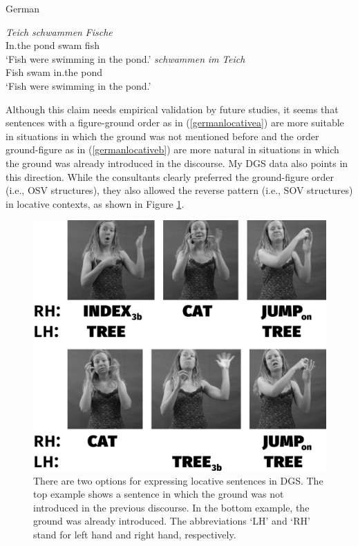 \begin{exe}
\ex German \label{germanlocative}\begin{xlist} 
\ex {} {\textit{Teich}} {\textit{schwammen}} {\textit{Fische}}\\
{In.the} {pond} {swam} {fish}  \\
\trans `Fish were swimming in the pond.' \label{germanlocativea}
\ex {} {\textit{schwammen}} {\textit{im}} {\textit{Teich}}  \\
{Fish} {swam} {in.the} {pond} \\
\trans `Fish were swimming in the pond.' \label{germanlocativeb}

\end{xlist}
\end{exe} 

\noindent Although this claim needs empirical validation by future studies, it seems that sentences with a figure-ground order as in (\ref{germanlocativea}) are more suitable in situations in which the ground was not mentioned before and the order ground-figure as in  (\ref{germanlocativeb}) are more natural in situations in which the ground was already introduced in the discourse. My DGS data also points in this direction. While the consultants clearly preferred the ground-figure order (i.e., OSV structures), they also allowed the reverse pattern (i.e., SOV structures) in locative contexts, as shown in  Figure \ref{fig:figuregroundcat}.

\begin{figure}[bt]
\centering
	\includegraphics[width=1.0\textwidth]{figuregroundcatsw.jpg}
	\caption{There are two options for expressing locative sentences in DGS. The top example shows a sentence in which the ground was not introduced in the previous discourse. In the bottom example, the ground was already introduced. The abbreviations `LH' and `RH' stand for left hand and right hand, respectively.}
	\label{fig:figuregroundcat}
\end{figure}


